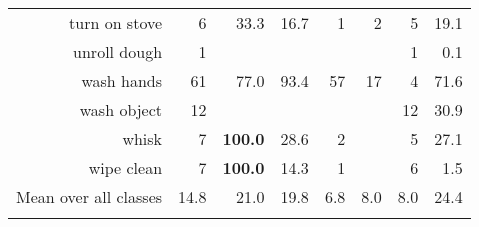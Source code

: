 \begin{tabular}{r r r@{\ \ }r@{\ \ }r@{\ \ }r@{\ \ }r r}
turn on stove & 6 & 33.3 & 16.7 & 1 & 2 & 5 & 19.1 \\
unroll dough & 1 &  &  &  &  & 1 & 0.1 \\
wash hands & 61 & 77.0 & 93.4 & 57 & 17 & 4 & 71.6 \\
wash object & 12 &  &  &  &  & 12 & 30.9 \\
whisk & 7 & \textbf{100.0} & 28.6 & 2 &  & 5 & 27.1 \\
wipe clean & 7 & \textbf{100.0} & 14.3 & 1 &  & 6 & 1.5 \\
\cmidrule(lr){1-1} \cmidrule(lr){2-2} \cmidrule(lr){3-7} \cmidrule(lr){8-8}
Mean over all classes&14.8&21.0&19.8&6.8&8.0&8.0&24.4
\\ \bottomrule \\ \end{tabular}
